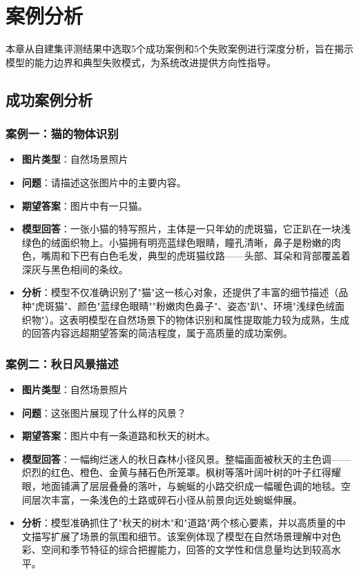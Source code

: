 
\chapter{案例分析}
\label{cha:case_analysis}

本章从自建集评测结果中选取5个成功案例和5个失败案例进行深度分析，旨在揭示模型的能力边界和典型失败模式，为系统改进提供方向性指导。

\section{成功案例分析}

\subsection{案例一：猫的物体识别}

\begin{itemize}
  \item \textbf{图片类型}：自然场景照片
  \item \textbf{问题}：请描述这张图片中的主要内容。
  \item \textbf{期望答案}：图片中有一只猫。
  \item \textbf{模型回答}：一张小猫的特写照片，主体是一只年幼的虎斑猫，它正趴在一块浅绿色的绒面织物上。小猫拥有明亮蓝绿色眼睛，瞳孔清晰，鼻子是粉嫩的肉色，嘴周和下巴有白色毛发，典型的虎斑猫纹路——头部、耳朵和背部覆盖着深灰与黑色相间的条纹。
  \item \textbf{分析}：模型不仅准确识别了"猫"这一核心对象，还提供了丰富的细节描述（品种"虎斑猫"、颜色"蓝绿色眼睛""粉嫩肉色鼻子"、姿态"趴"、环境"浅绿色绒面织物"）。这表明模型在自然场景下的物体识别和属性提取能力较为成熟，生成的回答内容远超期望答案的简洁程度，属于高质量的成功案例。
\end{itemize}

\subsection{案例二：秋日风景描述}

\begin{itemize}
  \item \textbf{图片类型}：自然场景照片
  \item \textbf{问题}：这张图片展现了什么样的风景？
  \item \textbf{期望答案}：图片中有一条道路和秋天的树木。
  \item \textbf{模型回答}：一幅绚烂迷人的秋日森林小径风景。整幅画面被秋天的主色调——炽烈的红色、橙色、金黄与赭石色所笼罩。枫树等落叶阔叶树的叶子红得耀眼，地面铺满了层层叠叠的落叶，与蜿蜒的小路交织成一幅暖色调的地毯。空间层次丰富，一条浅色的土路或碎石小径从前景向远处蜿蜒伸展。
  \item \textbf{分析}：模型准确抓住了"秋天的树木"和"道路"两个核心要素，并以高质量的中文描写扩展了场景的氛围和细节。该案例体现了模型在自然场景理解中对色彩、空间和季节特征的综合把握能力，回答的文学性和信息量均达到较高水平。
\end{itemize}

